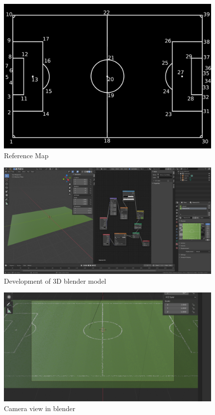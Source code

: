 \documentclass[
    11pt,
    twoside
]{report}
\begin{document}
\begin{appendices}
\begin{figure}[H]
    \includegraphics[keepaspectratio, width=\columnwidth]{coordinates.png}
    \caption{Reference Map}
    \label{img:ref_map}
\end{figure}

\begin{figure}[H]
    \includegraphics[keepaspectratio, width=\columnwidth]{Screenshot_from_2021-10-22_13-59-52.png}
    \caption{Development of 3D blender model}
    \label{img:texture}
\end{figure}


\begin{figure}[H]
    \includegraphics[keepaspectratio, width=\columnwidth]{Screenshot_2021-12-17_19-08-06.png}
    \caption{Camera view in blender}
    \label{img:cam_grass}
\end{figure}



\end{appendices}
\end{document}
